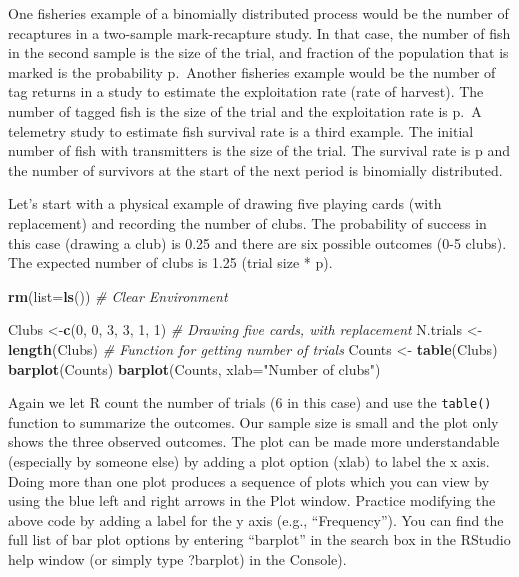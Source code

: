 \documentclass[
]{krantz}
\makeatletter
\newenvironment{Shaded}{\begin{snugshade}}{\end{snugshade}}
\newcommand{\AttributeTok}[1]{\textcolor[rgb]{0.27,0.27,0.27}{#1}}
\newcommand{\CommentTok}[1]{\textcolor[rgb]{0.37,0.37,0.37}{\textit{#1}}}
\newcommand{\DecValTok}[1]{\textcolor[rgb]{0.06,0.06,0.06}{#1}}
\newcommand{\FunctionTok}[1]{\textcolor[rgb]{0.27,0.27,0.27}{\textbf{#1}}}
\newcommand{\NormalTok}[1]{#1}
\newcommand{\OtherTok}[1]{\textcolor[rgb]{0.37,0.37,0.37}{#1}}
\newcommand{\StringTok}[1]{\textcolor[rgb]{0.5,0.5,0.5}{#1}}
\newenvironment{kframe}{%
\medskip{}
\setlength{\fboxsep}{.8em}
 \def\at@end@of@kframe{}%
 \ifinner\ifhmode%
  \def\at@end@of@kframe{\end{minipage}}%
  \begin{minipage}{\columnwidth}%
 \fi\fi%
 \def\FrameCommand##1{\hskip\@totalleftmargin \hskip-\fboxsep
 \colorbox{shadecolor}{##1}\hskip-\fboxsep
     \hskip-\linewidth \hskip-\@totalleftmargin \hskip\columnwidth}%
 \MakeFramed {\advance\hsize-\width
   \@totalleftmargin\z@ \linewidth\hsize
   \@setminipage}}%
 {\par\unskip\endMakeFramed%
 \at@end@of@kframe}
\renewenvironment{Shaded}{\begin{kframe}}{\end{kframe}}
\makeatother
\begin{document}
One fisheries example of a binomially distributed process would be the number of recaptures in a two-sample mark-recapture study. In that case, the number of fish in the second sample is the size of the trial, and fraction of the population that is marked is the probability p.~Another fisheries example would be the number of tag returns in a study to estimate the exploitation rate (rate of harvest). The number of tagged fish is the size of the trial and the exploitation rate is p.~A telemetry study to estimate fish survival rate is a third example. The initial number of fish with transmitters is the size of the trial. The survival rate is p and the number of survivors at the start of the next period is binomially distributed.

Let's start with a physical example of drawing five playing cards (with replacement) and recording the number of clubs. The probability of success in this case (drawing a club) is 0.25 and there are six possible outcomes (0-5 clubs). The expected number of clubs is 1.25 (trial size * p).

\begin{Shaded}
\begin{Highlighting}[]
\FunctionTok{rm}\NormalTok{(}\AttributeTok{list=}\FunctionTok{ls}\NormalTok{()) }\CommentTok{\# Clear Environment}

\NormalTok{Clubs }\OtherTok{\textless{}{-}}\FunctionTok{c}\NormalTok{(}\DecValTok{0}\NormalTok{, }\DecValTok{0}\NormalTok{, }\DecValTok{3}\NormalTok{, }\DecValTok{3}\NormalTok{, }\DecValTok{1}\NormalTok{, }\DecValTok{1}\NormalTok{)  }\CommentTok{\# Drawing five cards, with replacement}
\NormalTok{N.trials }\OtherTok{\textless{}{-}} \FunctionTok{length}\NormalTok{(Clubs) }\CommentTok{\# Function for getting number of trials}
\NormalTok{Counts }\OtherTok{\textless{}{-}} \FunctionTok{table}\NormalTok{(Clubs)}
\FunctionTok{barplot}\NormalTok{(Counts)}
\FunctionTok{barplot}\NormalTok{(Counts, }\AttributeTok{xlab=}\StringTok{"Number of clubs"}\NormalTok{)}
\end{Highlighting}
\end{Shaded}

Again we let R count the number of trials (6 in this case) and use the \texttt{table()} function to summarize the outcomes. Our sample size is small and the plot only shows the three observed outcomes. The plot can be made more understandable (especially by someone else) by adding a plot option (xlab) to label the x axis. Doing more than one plot produces a sequence of plots which you can view by using the blue left and right arrows in the Plot window. Practice modifying the above code by adding a label for the y axis (e.g., ``Frequency''). You can find the full list of bar plot options by entering ``barplot'' in the search box in the RStudio help window (or simply type ?barplot) in the Console).
\end{document}
